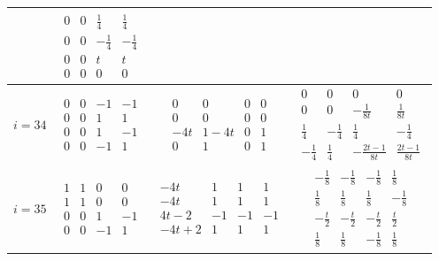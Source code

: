 \documentclass[reqno]{amsart}
\theoremstyle{definition}
\numberwithin{equation}{section}
\theoremstyle{remark}
\begin{document}
\begin{longtable}{|c|c|c|c|}
& $\begin{matrix}
0 & 0 & \tfrac{1}{4} & \tfrac{1}{4} \\
0 & 0 & -\tfrac{1}{4} & -\tfrac{1}{4} \\
0 & 0 & t & t \\
0 & 0 & 0 & 0
\end{matrix}$ \\ \hline
$i=34$
& $\begin{matrix}
0 & 0 & -1 & -1 \\
0 & 0 & 1 & 1 \\
0 & 0 & 1 & -1 \\
0 & 0 & -1 & 1
\end{matrix}$
& $\begin{matrix}
0 & 0 & 0 & 0 \\
0 & 0 & 0 & 0 \\
-4t & 1-4t & 0 & 1 \\
0 & 1 & 0 & 1
\end{matrix}$
& $\begin{matrix}
0 & 0 & 0 & 0 \\
0 & 0 & -\tfrac{1}{8t} & \tfrac{1}{8t} \\
\tfrac{1}{4} & -\tfrac{1}{4} & \tfrac{1}{4} & -\tfrac{1}{4} \\
-\tfrac{1}{4} & \tfrac{1}{4} & -\tfrac{2t-1}{8t} & \tfrac{2t-1}{8t}
\end{matrix}$ \\ \hline
$i=35$
& $\begin{matrix}
1 & 1 & 0 & 0 \\
1 & 1 & 0 & 0 \\
0 & 0 & 1 & -1 \\
0 & 0 & -1 & 1
\end{matrix}$
& $\begin{matrix}
-4t & 1 & 1 & 1 \\
-4t & 1 & 1 & 1 \\
4t-2 & -1 & -1 & -1 \\
-4t+2 & 1 & 1 & 1
\end{matrix}$
& $\begin{matrix}
-\tfrac{1}{8} & -\tfrac{1}{8} & -\tfrac{1}{8} & \tfrac{1}{8} \\
\tfrac{1}{8} & \tfrac{1}{8} & \tfrac{1}{8} & -\tfrac{1}{8} \\
-\tfrac{t}{2} & -\tfrac{t}{2} & -\tfrac{t}{2} & \tfrac{t}{2} \\
\tfrac{1}{8} & \tfrac{1}{8} & -\tfrac{1}{8} & \tfrac{1}{8}
\end{matrix}$ \\ \hline

\end{longtable}
\end{document}
